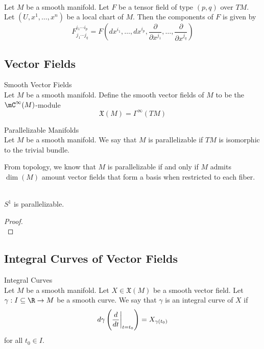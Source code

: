 \documentclass[a4paper]{article}
\begin{document}
\begin{prp}{}{}\\
Let $M$ be a smooth manifold. Let $F$ be a tensor field of type $(p,q)$ over $TM$. Let $(U,x^1,\dots,x^n)$ be a local chart of $M$. Then the components of $F$ is given by $$F^{i_1\cdots i_p}_{j_1\cdots j_q}=F\left(dx^{i_1},\dots,dx^{i_p},\frac{\partial}{\partial x^{j_1}},\dots,\frac{\partial}{\partial x^{j_q}}\right)$$
\end{prp}

\subsection{Vector Fields}
\begin{defn}{Smooth Vector Fields}{}\\
Let $M$ be a smooth manifold. Define the smooth vector fields of $M$ to be the $\mC^\infty(M)$-module $$\mathfrak{X}(M)=\Gamma^\infty(TM)$$
\end{defn}

\begin{defn}{Parallelizable Manifolds}{}\\
Let $M$ be a smooth manifold. We say that $M$ is parallelizable if $TM$ is isomorphic to the trivial bundle. 
\end{defn}

From topology, we know that $M$ is parallelizable if and only if $M$ admits $\dim(M)$ amount vector fields that form a basis when restricted to each fiber. 

\begin{eg}{}{}\\
$S^1$ is parallelizable. 
\begin{proof}\\

\end{proof}
\end{eg}

\subsection{Integral Curves of Vector Fields}
\begin{defn}{Integral Curves}{}\\
Let $M$ be a smooth manifold. Let $X\in\mathfrak{X}(M)$ be a smooth vector field. Let $\gamma:I\subseteq\R\to M$ be a smooth curve. We say that $\gamma$ is an integral curve of $X$ if $$d\gamma\left(\frac{d}{dt}\bigg{|}_{t=t_0}\right)=X_{\gamma(t_0)}$$ for all $t_0\in I$. 
\end{defn}
\end{document}
